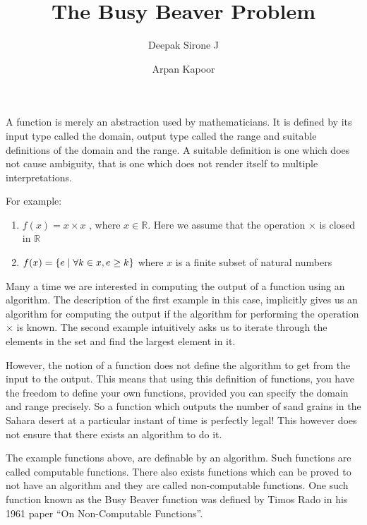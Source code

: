 \documentclass[a4paper]{article}
\begin{document}
\title{The Busy Beaver Problem}
\author{Deepak Sirone J \and Arpan Kapoor}
\maketitle

A function is merely an abstraction used by mathematicians. It is defined by
its input type called the domain, output type called the range and suitable
definitions of the domain and the range. A suitable definition is one which
does not cause ambiguity, that is one which does not render itself to multiple
interpretations.

For example:
\begin{enumerate}
  \item \(f(x) = x \times x\) , where \(x \in \mathbb{R}\).
    Here we assume that the operation \(\times\) is closed in \(\mathbb{R}\)

  \item \(f(x) = \{e \mid \forall k \in x,\space \space e \geq k\}\) where
    \(x\) is a finite subset of natural numbers
\end{enumerate}

Many a time we are interested in computing the output of a function using an
algorithm. The description of the first example in this case, implicitly gives
us an algorithm for computing the output if the algorithm for performing the
operation \(\times\) is known. The second example intuitively asks us to
iterate through the elements in the set and find the largest element in it.

However, the notion of a function does not define the algorithm to get from
the input to the output. This means that using this definition of functions,
you have the freedom to define your own functions, provided you can specify the
domain and range precisely. So a function which outputs the number of sand
grains in the Sahara desert at a particular instant of time is perfectly legal!
This however does not ensure that there exists an algorithm to do it.

The example functions above, are definable by an algorithm. Such functions are
called computable functions. There also exists functions which can be proved
to not have an algorithm and they are called non-computable functions. One such
function known as the Busy Beaver function was defined by Timos Rado in his
1961 paper ``On Non-Computable Functions''\cite{rado_non-computable_1962}.
\end{document}
